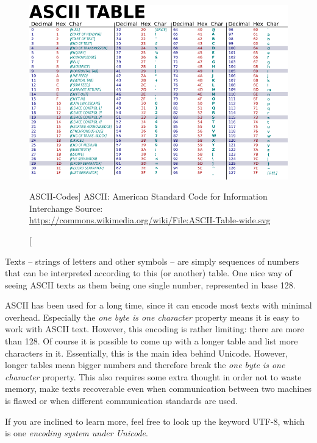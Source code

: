 \begin{figure}
\includegraphics[width=\linewidth]{./gfx/ASCII_table}\newline
\caption
	[ASCII-Codes]
	{ASCII: American Standard Code for Information Interchange\newline
         Source: \url{https://commons.wikimedia.org/wiki/File:ASCII-Table-wide.svg}
    }
\label{fig:ASCII}
\end{figure}

Texts -- \ie strings of letters and other symbols -- are simply sequences of numbers that can be interpreted according to this (or another) table. One nice way of seeing ASCII texts as them being one single number, represented in base 128.

\begin{plusbox}
ASCII has been used for a long time, since it can encode most texts with minimal overhead. Especially the \emph{one byte is one character} property means it is easy to work with ASCII text. However, this encoding is rather limiting: there are more than 128\citationneeded. Of course it is possible to come up with a longer table and list more characters in it. Essentially, this is the main idea behind Unicode. However, longer tables mean bigger numbers and therefore break the \emph{one byte is one character} property. This also requires some extra thought in order not to waste memory, make texts recoverable even when communication between two machines is flawed or when different communication standards are used.

If you are inclined to learn more, feel free to look up the keyword UTF-8, which is one \emph{encoding system under Unicode}.
\end{plusbox}

